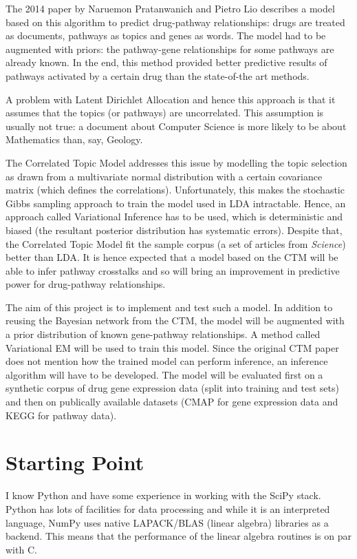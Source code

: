 \documentclass[12pt,a4]{article}
\begin{document}
The 2014 paper\cite{Pratanwanich2014} by Naruemon Pratanwanich and Pietro Lio describes a model based on this algorithm to predict drug-pathway relationships:  drugs are treated as documents, pathways as topics and genes as words. The model had to be augmented with priors: the pathway-gene relationships for some pathways are already known. In the end, this method provided better predictive results of pathways activated by a certain drug than the state-of-the art methods.

A problem with Latent Dirichlet Allocation and hence this approach is that it assumes that the topics (or pathways) are uncorrelated. This assumption is usually not true: a document about Computer Science is more likely to be about Mathematics than, say, Geology. 

The Correlated Topic Model\cite{2007} addresses this issue by modelling the topic selection as drawn from a multivariate normal distribution with a certain covariance matrix (which defines the correlations). Unfortunately, this makes the stochastic Gibbs sampling approach to train the model used in LDA intractable. Hence, an approach called Variational Inference has to be used, which is deterministic and biased (the resultant posterior distribution has systematic errors). Despite that, the Correlated Topic Model fit the sample corpus (a set of articles from {\em Science}) better than LDA\cite{2007}. It is hence expected that a model based on the CTM will be able to infer pathway crosstalks and so will bring an improvement in predictive power for drug-pathway relationships.

The aim of this project is to implement and test such a model. In addition to reusing the Bayesian network from the CTM, the model will be augmented with a prior distribution of known gene-pathway relationships. A method called Variational EM will be used to train this model. Since the original CTM paper does not mention how the trained model can perform inference, an inference algorithm will have to be developed. The model will be evaluated first on a synthetic corpus of drug gene expression data (split into training and test sets) and then on publically available datasets (CMAP\cite{CMap} for gene expression data and KEGG\cite{KEGG} for pathway data).

\section*{Starting Point}

I know Python and have some experience in working with the SciPy stack. Python has lots of facilities for data processing and while it is an interpreted language, NumPy uses native LAPACK/BLAS (linear algebra) libraries as a backend. This means that the performance of the linear algebra routines is on par with C.
\end{document}
